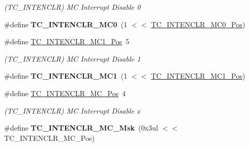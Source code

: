 \begin{DoxyCompactItemize}
\begin{DoxyCompactList}\small\item\em (T\+C\+\_\+\+I\+N\+T\+E\+N\+C\+L\+R) M\+C Interrupt Disable 0 \end{DoxyCompactList}\item 
\hypertarget{group___s_a_m_l21___t_c_ga785b9ecc4202b0558d377541a81b36f7}{}\#define {\bfseries T\+C\+\_\+\+I\+N\+T\+E\+N\+C\+L\+R\+\_\+\+M\+C0}~(1 $<$$<$ \hyperlink{group___s_a_m_l21___t_c_ga04317541f61352516d78133796dd3dfc}{T\+C\+\_\+\+I\+N\+T\+E\+N\+C\+L\+R\+\_\+\+M\+C0\+\_\+\+Pos})\label{group___s_a_m_l21___t_c_ga785b9ecc4202b0558d377541a81b36f7}

\item 
\hypertarget{group___s_a_m_l21___t_c_gab7fc14644fd9f8611b8d0ea22ee30f4c}{}\#define \hyperlink{group___s_a_m_l21___t_c_gab7fc14644fd9f8611b8d0ea22ee30f4c}{T\+C\+\_\+\+I\+N\+T\+E\+N\+C\+L\+R\+\_\+\+M\+C1\+\_\+\+Pos}~5\label{group___s_a_m_l21___t_c_gab7fc14644fd9f8611b8d0ea22ee30f4c}

\begin{DoxyCompactList}\small\item\em (T\+C\+\_\+\+I\+N\+T\+E\+N\+C\+L\+R) M\+C Interrupt Disable 1 \end{DoxyCompactList}\item 
\hypertarget{group___s_a_m_l21___t_c_gac037ee7549ccaaeaa2d8002b328b27ec}{}\#define {\bfseries T\+C\+\_\+\+I\+N\+T\+E\+N\+C\+L\+R\+\_\+\+M\+C1}~(1 $<$$<$ \hyperlink{group___s_a_m_l21___t_c_gab7fc14644fd9f8611b8d0ea22ee30f4c}{T\+C\+\_\+\+I\+N\+T\+E\+N\+C\+L\+R\+\_\+\+M\+C1\+\_\+\+Pos})\label{group___s_a_m_l21___t_c_gac037ee7549ccaaeaa2d8002b328b27ec}

\item 
\hypertarget{group___s_a_m_l21___t_c_ga3826df25c9857e2d7c15e1eb646fab6d}{}\#define \hyperlink{group___s_a_m_l21___t_c_ga3826df25c9857e2d7c15e1eb646fab6d}{T\+C\+\_\+\+I\+N\+T\+E\+N\+C\+L\+R\+\_\+\+M\+C\+\_\+\+Pos}~4\label{group___s_a_m_l21___t_c_ga3826df25c9857e2d7c15e1eb646fab6d}

\begin{DoxyCompactList}\small\item\em (T\+C\+\_\+\+I\+N\+T\+E\+N\+C\+L\+R) M\+C Interrupt Disable x \end{DoxyCompactList}\item 
\hypertarget{group___s_a_m_l21___t_c_ga602ab940f6ef6e0b1a9c48face0d32c5}{}\#define {\bfseries T\+C\+\_\+\+I\+N\+T\+E\+N\+C\+L\+R\+\_\+\+M\+C\+\_\+\+Msk}~(0x3ul $<$$<$ T\+C\+\_\+\+I\+N\+T\+E\+N\+C\+L\+R\+\_\+\+M\+C\+\_\+\+Pos)\label{group___s_a_m_l21___t_c_ga602ab940f6ef6e0b1a9c48face0d32c5}


\end{DoxyCompactItemize}
